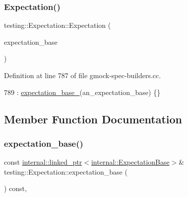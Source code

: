 \subsubsection{\texorpdfstring{Expectation()}{Expectation()}\hspace{0.1cm}{\footnotesize\ttfamily [3/3]}}
{\footnotesize\ttfamily testing\+::\+Expectation\+::\+Expectation (\begin{DoxyParamCaption}\item[{const \hyperlink{classtesting_1_1internal_1_1linked__ptr}{internal\+::linked\+\_\+ptr}$<$ \hyperlink{classtesting_1_1internal_1_1ExpectationBase}{internal\+::\+Expectation\+Base} $>$ \&}]{expectation\+\_\+base }\end{DoxyParamCaption})\hspace{0.3cm}{\ttfamily [private]}}



Definition at line 787 of file gmock-\/spec-\/builders.\+cc.


\begin{DoxyCode}
789     : \hyperlink{classtesting_1_1Expectation_a96caf8f40e769b68ea010c098f7190fa}{expectation\_base\_}(an\_expectation\_base) \{\}
\end{DoxyCode}


\subsection{Member Function Documentation}
\mbox{\label{classtesting_1_1Expectation_abd4dcb022d192d92b529d1ddefbfd8a9}} 
\subsubsection{\texorpdfstring{expectation\+\_\+base()}{expectation\_base()}}
{\footnotesize\ttfamily const \hyperlink{classtesting_1_1internal_1_1linked__ptr}{internal\+::linked\+\_\+ptr}$<$\hyperlink{classtesting_1_1internal_1_1ExpectationBase}{internal\+::\+Expectation\+Base}$>$\& testing\+::\+Expectation\+::expectation\+\_\+base (\begin{DoxyParamCaption}{ }\end{DoxyParamCaption}) const\hspace{0.3cm}{\ttfamily [inline]}, {\ttfamily [private]}}



